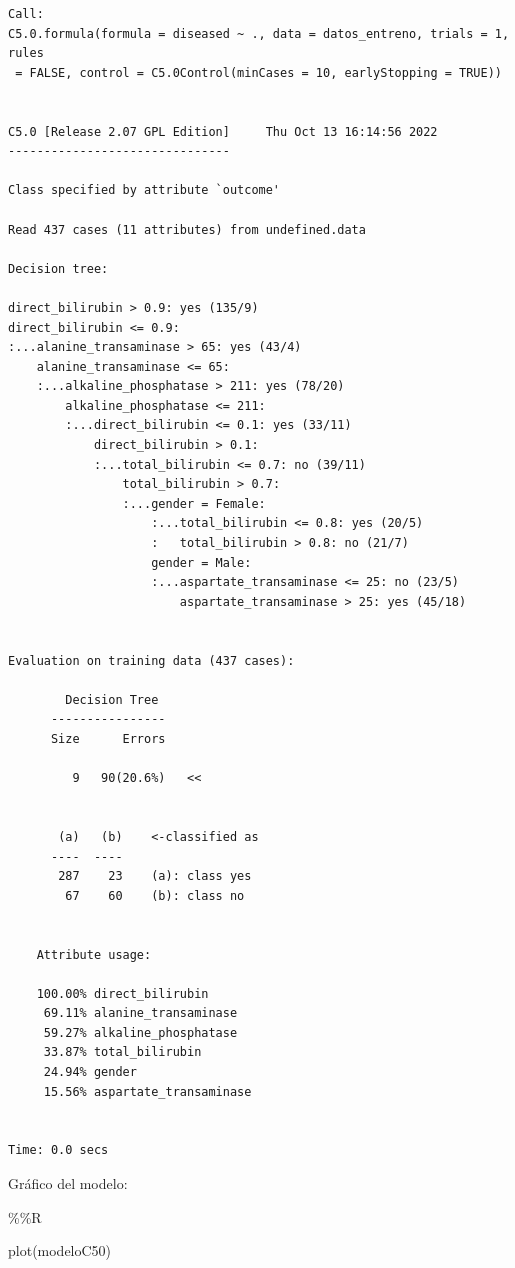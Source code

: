 \documentclass[
  11pt,
  a4paper,
]{article}
\newenvironment{Shaded}{\begin{snugshade}}{\end{snugshade}}
\newcommand{\FunctionTok}[1]{\textcolor[rgb]{0.00,0.00,0.00}{#1}}
\newcommand{\NormalTok}[1]{#1}
\newcommand{\SpecialCharTok}[1]{\textcolor[rgb]{0.00,0.00,0.00}{#1}}
\begin{document}
\begin{verbatim}
Call:
C5.0.formula(formula = diseased ~ ., data = datos_entreno, trials = 1, rules
 = FALSE, control = C5.0Control(minCases = 10, earlyStopping = TRUE))


C5.0 [Release 2.07 GPL Edition]     Thu Oct 13 16:14:56 2022
-------------------------------

Class specified by attribute `outcome'

Read 437 cases (11 attributes) from undefined.data

Decision tree:

direct_bilirubin > 0.9: yes (135/9)
direct_bilirubin <= 0.9:
:...alanine_transaminase > 65: yes (43/4)
    alanine_transaminase <= 65:
    :...alkaline_phosphatase > 211: yes (78/20)
        alkaline_phosphatase <= 211:
        :...direct_bilirubin <= 0.1: yes (33/11)
            direct_bilirubin > 0.1:
            :...total_bilirubin <= 0.7: no (39/11)
                total_bilirubin > 0.7:
                :...gender = Female:
                    :...total_bilirubin <= 0.8: yes (20/5)
                    :   total_bilirubin > 0.8: no (21/7)
                    gender = Male:
                    :...aspartate_transaminase <= 25: no (23/5)
                        aspartate_transaminase > 25: yes (45/18)


Evaluation on training data (437 cases):

        Decision Tree   
      ----------------  
      Size      Errors  

         9   90(20.6%)   <<


       (a)   (b)    <-classified as
      ----  ----
       287    23    (a): class yes
        67    60    (b): class no


    Attribute usage:

    100.00% direct_bilirubin
     69.11% alanine_transaminase
     59.27% alkaline_phosphatase
     33.87% total_bilirubin
     24.94% gender
     15.56% aspartate_transaminase


Time: 0.0 secs
\end{verbatim}

Gráfico del modelo:

\begin{Shaded}
\begin{Highlighting}[]
\SpecialCharTok{\%\%}\NormalTok{R}

\FunctionTok{plot}\NormalTok{(modeloC50)}
\end{Highlighting}
\end{Shaded}
\end{document}

